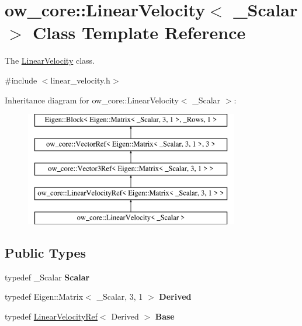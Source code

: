 \hypertarget{classow__core_1_1LinearVelocity}{}\section{ow\+\_\+core\+:\+:Linear\+Velocity$<$ \+\_\+\+Scalar $>$ Class Template Reference}
\label{classow__core_1_1LinearVelocity}


The \hyperlink{classow__core_1_1LinearVelocity}{Linear\+Velocity} class.  




{\ttfamily \#include $<$linear\+\_\+velocity.\+h$>$}

Inheritance diagram for ow\+\_\+core\+:\+:Linear\+Velocity$<$ \+\_\+\+Scalar $>$\+:\begin{figure}[H]
\begin{center}
\leavevmode
\includegraphics[height=5.000000cm]{d3/d6e/classow__core_1_1LinearVelocity}
\end{center}
\end{figure}
\subsection*{Public Types}
\begin{DoxyCompactItemize}
\item 
typedef \+\_\+\+Scalar {\bfseries Scalar}\hypertarget{classow__core_1_1LinearVelocity_a088145bea5e0ce67c36e3704f2d302b1}{}\label{classow__core_1_1LinearVelocity_a088145bea5e0ce67c36e3704f2d302b1}

\item 
typedef Eigen\+::\+Matrix$<$ \+\_\+\+Scalar, 3, 1 $>$ {\bfseries Derived}\hypertarget{classow__core_1_1LinearVelocity_ae8c201d9e6bfb9758c8d65fd323e6176}{}\label{classow__core_1_1LinearVelocity_ae8c201d9e6bfb9758c8d65fd323e6176}

\item 
typedef \hyperlink{classow__core_1_1LinearVelocityRef}{Linear\+Velocity\+Ref}$<$ Derived $>$ {\bfseries Base}\hypertarget{classow__core_1_1LinearVelocity_a8f6f9c2d4861093ae198754313d8f4f5}{}\label{classow__core_1_1LinearVelocity_a8f6f9c2d4861093ae198754313d8f4f5}

\end{DoxyCompactItemize}
